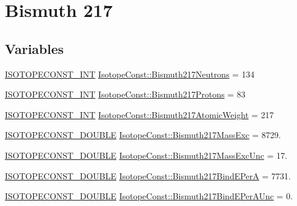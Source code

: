 \hypertarget{group___isotope_const-_bismuth-_bi217}{}\section{Bismuth 217}
\label{group___isotope_const-_bismuth-_bi217}
\subsection*{Variables}
\begin{DoxyCompactItemize}
\item 
\mbox{\hyperlink{group___isotope_const-_macros_ga5f18360b3e99483a35c32d789e62621c}{I\+S\+O\+T\+O\+P\+E\+C\+O\+N\+S\+T\+\_\+\+I\+NT}} \mbox{\hyperlink{group___isotope_const-_bismuth-_bi217_ga3e3167689859c45f1df4df899eb65429}{Isotope\+Const\+::\+Bismuth217\+Neutrons}} = 134
\item 
\mbox{\hyperlink{group___isotope_const-_macros_ga5f18360b3e99483a35c32d789e62621c}{I\+S\+O\+T\+O\+P\+E\+C\+O\+N\+S\+T\+\_\+\+I\+NT}} \mbox{\hyperlink{group___isotope_const-_bismuth-_bi217_ga388bc3362edc22bcec1b32ef064ba9a9}{Isotope\+Const\+::\+Bismuth217\+Protons}} = 83
\item 
\mbox{\hyperlink{group___isotope_const-_macros_ga5f18360b3e99483a35c32d789e62621c}{I\+S\+O\+T\+O\+P\+E\+C\+O\+N\+S\+T\+\_\+\+I\+NT}} \mbox{\hyperlink{group___isotope_const-_bismuth-_bi217_ga1aa78d8ddf62b6e94b893dd92f1106c9}{Isotope\+Const\+::\+Bismuth217\+Atomic\+Weight}} = 217
\item 
\mbox{\hyperlink{group___isotope_const-_macros_ga8f45a7272ce02c0b4c65c44636ed719a}{I\+S\+O\+T\+O\+P\+E\+C\+O\+N\+S\+T\+\_\+\+D\+O\+U\+B\+LE}} \mbox{\hyperlink{group___isotope_const-_bismuth-_bi217_gaf9ac88a266765a22357cddb37c00228f}{Isotope\+Const\+::\+Bismuth217\+Mass\+Exc}} = 8729.
\item 
\mbox{\hyperlink{group___isotope_const-_macros_ga8f45a7272ce02c0b4c65c44636ed719a}{I\+S\+O\+T\+O\+P\+E\+C\+O\+N\+S\+T\+\_\+\+D\+O\+U\+B\+LE}} \mbox{\hyperlink{group___isotope_const-_bismuth-_bi217_gac06ee3883bd6ea625a668fcbbab20b5e}{Isotope\+Const\+::\+Bismuth217\+Mass\+Exc\+Unc}} = 17.
\item 
\mbox{\hyperlink{group___isotope_const-_macros_ga8f45a7272ce02c0b4c65c44636ed719a}{I\+S\+O\+T\+O\+P\+E\+C\+O\+N\+S\+T\+\_\+\+D\+O\+U\+B\+LE}} \mbox{\hyperlink{group___isotope_const-_bismuth-_bi217_ga7b9d72799d45cb617e8bf26211e88613}{Isotope\+Const\+::\+Bismuth217\+Bind\+E\+PerA}} = 7731.
\item 
\mbox{\hyperlink{group___isotope_const-_macros_ga8f45a7272ce02c0b4c65c44636ed719a}{I\+S\+O\+T\+O\+P\+E\+C\+O\+N\+S\+T\+\_\+\+D\+O\+U\+B\+LE}} \mbox{\hyperlink{group___isotope_const-_bismuth-_bi217_gacd401b964c74142d492a10ec005ffb59}{Isotope\+Const\+::\+Bismuth217\+Bind\+E\+Per\+A\+Unc}} = 0.

\end{DoxyCompactItemize}
